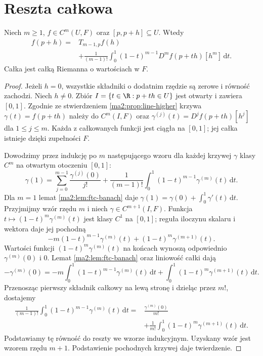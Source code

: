 \section{Reszta całkowa}
\begin{twierdzenie}
\label{ma2:thm:taylor-integral}
Niech $m\ge1$, $f\in C^m(U,F)$ oraz $[p,p+h]\subseteq U$.
Wtedy
\[
\begin{aligned}
 f(p+h)={}&T_{m-1,p}f(h)\\
 &+\frac{1}{(m-1)!}\int_0^1(1-t)^{m-1}
                   D^mf(p+th)[h^m]\,\mathrm dt.
\end{aligned}
\]
Całka jest całką Riemanna o wartościach w $F$.
\end{twierdzenie}
\begin{proof}
Jeżeli $h=0$, wszystkie składniki o dodatnim rzędzie
są zerowe i równość zachodzi. Niech $h\ne0$.
Zbiór $I=\{t\in\R:p+th\in U\}$ jest otwarty i zawiera
$[0,1]$. Zgodnie ze stwierdzeniem \ref{ma2:prop:line-higher}
krzywa $\gamma(t)=f(p+th)$ należy do $C^m(I,F)$ oraz
$\gamma^{(j)}(t)=D^jf(p+th)[h^j]$ dla $1\le j\le m$.
Każda z całkowanych funkcji jest ciągła na $[0,1]$;
jej całka istnieje dzięki zupełności $F$.

Dowodzimy przez indukcję po $m$ następującego wzoru
dla każdej krzywej $\gamma$ klasy $C^m$ na otwartym
otoczeniu $[0,1]$:
\[
 \gamma(1)=\sum_{j=0}^{m-1}\frac{\gamma^{(j)}(0)}{j!}
   +\frac1{(m-1)!}\int_0^1(1-t)^{m-1}
                           \gamma^{(m)}(t)\,\mathrm dt.
\]
Dla $m=1$ lemat \ref{ma2:lem:ftc-banach} daje
$\gamma(1)=\gamma(0)+\int_0^1\gamma'(t)\,\mathrm dt$.
Przyjmijmy wzór rzędu $m$ i niech $\gamma\in C^{m+1}(I,F)$.
Funkcja $t\mapsto (1-t)^m\gamma^{(m)}(t)$ jest klasy
$C^1$ na $[0,1]$; reguła iloczynu skalaru i wektora daje
jej pochodną
\[
 -m(1-t)^{m-1}\gamma^{(m)}(t)
       +(1-t)^m\gamma^{(m+1)}(t).
\]
Wartości funkcji $(1-t)^m\gamma^{(m)}(t)$ na końcach
wynoszą odpowiednio $\gamma^{(m)}(0)$ i $0$.
Lemat \ref{ma2:lem:ftc-banach} oraz liniowość całki dają
\[
 -\gamma^{(m)}(0)
 =-m\int_0^1(1-t)^{m-1}\gamma^{(m)}(t)\,\mathrm dt
   +\int_0^1(1-t)^m\gamma^{(m+1)}(t)\,\mathrm dt.
\]
Przenosząc pierwszy składnik całkowy na lewą stronę
i dzieląc przez $m!$, dostajemy
\[
\begin{aligned}
 \frac1{(m-1)!}\int_0^1(1-t)^{m-1}\gamma^{(m)}(t)\,\mathrm dt
 ={}&\frac{\gamma^{(m)}(0)}{m!}\\
 &+\frac1{m!}\int_0^1(1-t)^m\gamma^{(m+1)}(t)\,\mathrm dt .
\end{aligned}
\]
Podstawiamy tę równość do reszty we wzorze indukcyjnym.
Uzyskany wzór jest wzorem rzędu $m+1$.
Podstawienie pochodnych krzywej daje twierdzenie.
\end{proof}

